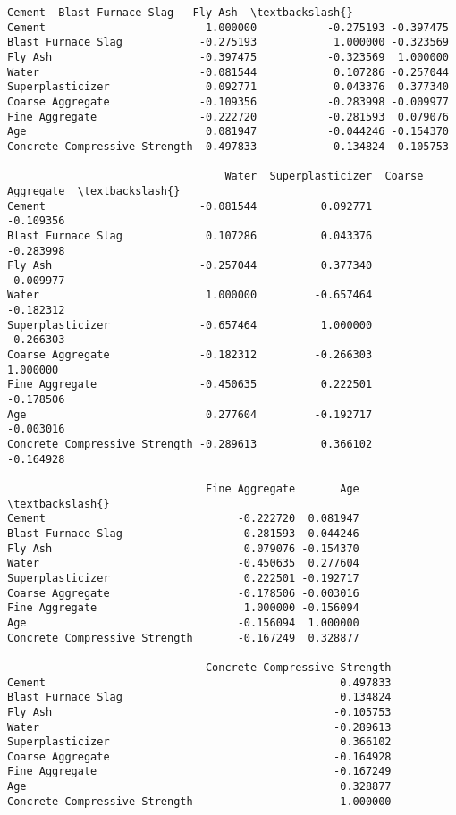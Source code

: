 \documentclass[11pt]{article}
\makeatletter
\newcommand{\boxspacing}{\kern\kvtcb@left@rule\kern\kvtcb@boxsep}
\newcommand{\prompt}[4]{
        {\ttfamily\llap{{\color{#2}[#3]:\hspace{3pt}#4}}\vspace{-\baselineskip}}
    }
\makeatother
\begin{document}
            \begin{tcolorbox}[breakable, size=fbox, boxrule=.5pt, pad at break*=1mm, opacityfill=0]
\prompt{Out}{outcolor}{141}{\boxspacing}
\begin{Verbatim}[commandchars=\\\{\}]
                                 Cement  Blast Furnace Slag   Fly Ash  \textbackslash{}
Cement                         1.000000           -0.275193 -0.397475
Blast Furnace Slag            -0.275193            1.000000 -0.323569
Fly Ash                       -0.397475           -0.323569  1.000000
Water                         -0.081544            0.107286 -0.257044
Superplasticizer               0.092771            0.043376  0.377340
Coarse Aggregate              -0.109356           -0.283998 -0.009977
Fine Aggregate                -0.222720           -0.281593  0.079076
Age                            0.081947           -0.044246 -0.154370
Concrete Compressive Strength  0.497833            0.134824 -0.105753

                                  Water  Superplasticizer  Coarse Aggregate  \textbackslash{}
Cement                        -0.081544          0.092771         -0.109356
Blast Furnace Slag             0.107286          0.043376         -0.283998
Fly Ash                       -0.257044          0.377340         -0.009977
Water                          1.000000         -0.657464         -0.182312
Superplasticizer              -0.657464          1.000000         -0.266303
Coarse Aggregate              -0.182312         -0.266303          1.000000
Fine Aggregate                -0.450635          0.222501         -0.178506
Age                            0.277604         -0.192717         -0.003016
Concrete Compressive Strength -0.289613          0.366102         -0.164928

                               Fine Aggregate       Age  \textbackslash{}
Cement                              -0.222720  0.081947
Blast Furnace Slag                  -0.281593 -0.044246
Fly Ash                              0.079076 -0.154370
Water                               -0.450635  0.277604
Superplasticizer                     0.222501 -0.192717
Coarse Aggregate                    -0.178506 -0.003016
Fine Aggregate                       1.000000 -0.156094
Age                                 -0.156094  1.000000
Concrete Compressive Strength       -0.167249  0.328877

                               Concrete Compressive Strength
Cement                                              0.497833
Blast Furnace Slag                                  0.134824
Fly Ash                                            -0.105753
Water                                              -0.289613
Superplasticizer                                    0.366102
Coarse Aggregate                                   -0.164928
Fine Aggregate                                     -0.167249
Age                                                 0.328877
Concrete Compressive Strength                       1.000000
\end{Verbatim}
\end{tcolorbox}
        
\end{document}
